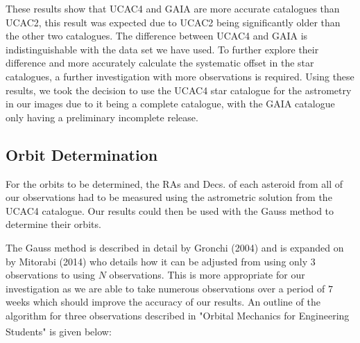 \documentclass[10pt, twocolumn]{revtex4}    %
\newcommand{\scite}[1]{\textsuperscript{\cite{#1}}}
\begin{document}
These results show that UCAC4 and GAIA are more accurate catalogues than UCAC2, this result was expected due to UCAC2 being significantly older than the other two catalogues. The difference between UCAC4 and GAIA is indistinguishable with the data set we have used. To further explore their difference and more accurately calculate the systematic offset in the star catalogues, a further investigation with more observations is required. Using these results, we took the decision to use the UCAC4 star catalogue for the astrometry in our images due to it being a complete catalogue, with the GAIA catalogue only having a preliminary incomplete release. 

\subsection*{Orbit Determination}

For the orbits to be determined, the RAs and Decs. of each asteroid from all of our observations had to be measured using the astrometric solution from the UCAC4 catalogue. Our results could then be used with the Gauss method to determine their orbits.

The Gauss method is described in detail by Gronchi (2004) and is expanded on by Mitorabi (2014) who details how it can be adjusted from using only $3$ observations to using $N$ observations. This is more appropriate for our investigation as we are able to take numerous observations over a period of $7$ weeks which should improve the accuracy of our results. An outline of the algorithm for three observations described in "Orbital Mechanics for Engineering Students"\scite{CurtisOrbitalmechanicsengineering2008} is given below:
\end{document}
